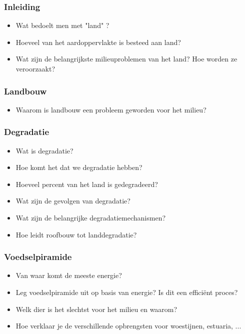 \documentclass[12pt]{article}
\begin{document}
    \subsubsection*{Inleiding}
    \begin{itemize}
        \item Wat bedoelt men met "land" ?
        \item Hoeveel van het aardoppervlakte is besteed aan land? 
        \item Wat zijn de belangrijkste milieuproblemen van het land? Hoe worden ze veroorzaakt?
    \end{itemize}

    \subsubsection*{Landbouw}
    \begin{itemize}
        \item Waarom is landbouw een probleem geworden voor het milieu?
    \end{itemize}

    \subsubsection*{Degradatie}
    \begin{itemize}
        \item Wat is degradatie?
        \item Hoe komt het dat we degradatie hebben?
        \item Hoeveel percent van het land is gedegradeerd?
        \item Wat zijn de gevolgen van degradatie?
        \item Wat zijn de belangrijke degradatiemechanismen?
        \item Hoe leidt roofbouw tot landdegradatie?
    \end{itemize}

    \subsubsection*{Voedselpiramide}
    \begin{itemize}
        \item Van waar komt de meeste energie?
        \item Leg voedselpiramide uit op basis van energie? Is dit een efficiënt proces?
        \item Welk dier is het slechtst voor het milieu en waarom?
        \item Hoe verklaar je de verschillende opbrengsten voor woestijnen, estuaria, ...
    \end{itemize}
\end{document}

